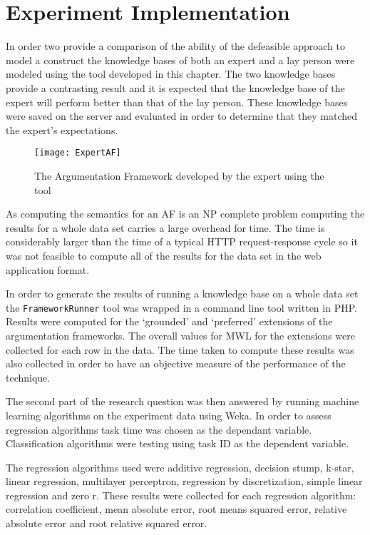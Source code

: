
\section{Experiment Implementation}

In order two provide a comparison of the ability of the defeasible approach to model a construct the knowledge bases of both an expert and a lay person were modeled using the tool developed in this chapter. The two knowledge bases provide a contrasting result and it is expected that the knowledge base of the expert will perform better than that of the lay person. These knowledge bases were saved on the server and evaluated in order to determine that they matched the expert's expectations.

\begin{figure}[H]
\centering
\texttt{[image: ExpertAF]}
\caption{The Argumentation Framework developed by the expert using the tool}
\end{figure}


As computing the semantics for an AF is an NP complete problem computing the results for a whole data set carries a large overhead for time. The time is considerably larger than the time of a typical HTTP request-response cycle so it was not feasible to compute all of the results for the data set in the web application format. 

In order to generate the results of running a knowledge base on a whole data set the \lstinline{FrameworkRunner} tool was wrapped in a command line tool written in PHP. Results were computed for the `grounded' and `preferred' extensions of the argumentation frameworks. The overall values for MWL for the extensions were collected for each row in the data. The time taken to compute these results was also collected in order to have an objective measure of the performance of the technique.

The second part of the research question was then answered by running machine learning algorithms on the experiment data using Weka. In order to assess regression algorithms task time was chosen as the dependant variable. Classification algorithms were testing using task ID as the dependent variable.

The regression algorithms used were additive regression, decision stump, k-star, linear regression, multilayer perceptron, regression by discretization, simple linear regression and zero r.
These results were collected for each regression algorithm: correlation coefficient, mean absolute error, root means squared error, relative absolute error and root relative squared error.

